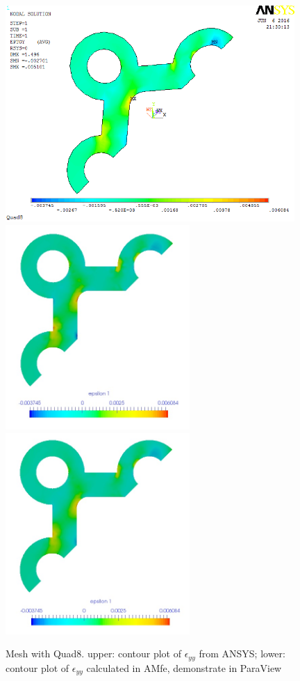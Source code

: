 \begin{figure}[htbp]
	\begin{center}
		\includegraphics[width=11cm,clip]{Quad8_Eyy.png} 	
		\includegraphics[width=7cm,clip]{Quad8_Eyy_PD.png} 			
		\includegraphics[width=7cm,clip]{Quad8_Eyy_P.png} 		
		\caption{Mesh with Quad8. upper: contour plot of $\epsilon_{yy}$ from ANSYS; lower: contour plot of $\epsilon_{yy}$ calculated in AMfe, demonstrate in ParaView} \label{fig: Quad8_Eyy}
	\end{center}
\end{figure}
\clearpage 


